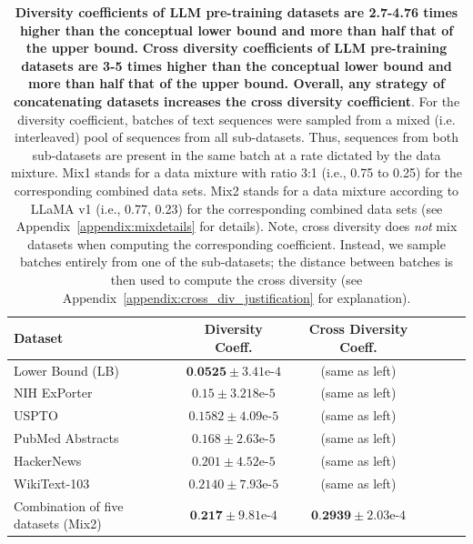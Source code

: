 \begin{table}[t]
\caption{\textbf{Diversity coefficients of LLM pre-training datasets are 2.7-4.76 times higher than the conceptual lower bound and more than half that of the upper bound.}
\textbf{Cross diversity coefficients of LLM pre-training datasets are 3-5 times higher than the conceptual lower bound and more than half that of the upper bound.
Overall, any strategy of concatenating datasets increases the cross diversity coefficient}.
For the diversity coefficient, batches of text sequences were sampled from a mixed (i.e. interleaved) pool of sequences from all sub-datasets. Thus, sequences from both sub-datasets are present in the same batch at a rate dictated by the data mixture.
Mix1 stands for a data mixture with ratio 3:1 (i.e., 0.75 to 0.25) for the corresponding combined data sets.
Mix2 stands for a data mixture according to LLaMA v1 (i.e., 0.77, 0.23) for the corresponding combined data sets (see Appendix~\ref{appendix:mixdetails} for details).
Note, cross diversity does \textit{not} mix datasets when computing the corresponding coefficient. Instead, we sample batches entirely from one of the sub-datasets; the distance between batches is then used to compute the cross diversity (see Appendix~\ref{appendix:cross_div_justification} for explanation).
}
\vskip 0.15in
\begin{center}
\begin{small}
\begin{sc}
\begin{tabular}{lccccr}
\toprule
Dataset & Diversity Coeff. & Cross Diversity Coeff. \\
\midrule
Lower Bound (LB) & $\textbf{0.0525}\pm 3.41\textrm{e-}4$ & (same as left) \\

NIH ExPorter & $0.15 \pm 3.218\textrm{e-}5$ & (same as left)\\
USPTO & $0.1582 \pm 4.09\textrm{e-}5$ & (same as left) \\
PubMed Abstracts & $0.168 \pm 2.63\textrm{e-}5$ & (same as left) \\
HackerNews & $0.201 \pm 4.52\textrm{e-}5$ & (same as left) \\

WikiText-103 & $0.2140 \pm 7.93\textrm{e-}5$ & (same as left) \\

Combination of five datasets (Mix2) & $ \textbf{0.217} \pm 9.81\textrm{e-}4$ & $\textbf{0.2939} \pm 2.03\textrm{e-}4$ \\


\end{tabular}
\end{sc}
\end{small}
\end{center}
\end{table}
